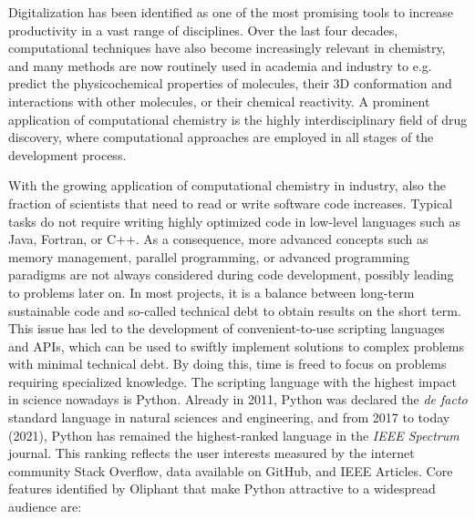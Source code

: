 Digitalization has been identified as one of the most promising tools to increase productivity in a vast range of disciplines.\cite{Tuomi2018}
Over the last four decades, computational techniques have also become increasingly relevant in chemistry, and many methods are now routinely used in academia and industry to e.g. predict the physicochemical properties of molecules, their 3D conformation and interactions with other molecules, or their chemical reactivity. A prominent application of computational chemistry is the highly interdisciplinary field of drug discovery, where computational approaches are employed in all stages of the development process.\cite{Chodera2011, Hansen2014, Abel2017, Cournia2017, Cournia2020, Meier2021}

With the growing application of computational chemistry in industry, also the fraction of scientists that need to read or write software code increases. Typical tasks do not require writing highly optimized code in low-level languages such as Java\cite{Gosling2000}, Fortran\cite{Backus1957}, or C++\cite{Stroustrup1995}. As a consequence, more advanced concepts such as memory management, parallel programming, or advanced programming paradigms are not always considered during code development, possibly leading to problems later on. In most projects, it is a balance between long-term sustainable code and so-called technical debt\cite{Alfayez2018} to obtain results on the short term. This issue has led to the development of convenient-to-use scripting languages and APIs, which can be used to swiftly implement solutions to complex problems with minimal technical debt. By doing this, time is freed to focus on problems requiring specialized knowledge.\cite{Ayer2014} The scripting language with the highest impact in science nowadays is Python. Already in 2011, Python was declared the \textit{de facto} standard language in natural sciences and engineering, and from 2017 to today (2021), Python has remained the highest-ranked language in the \textit{IEEE Spectrum} journal. This ranking reflects the user interests measured by the internet community Stack Overflow, data available on GitHub, and IEEE Articles. \cite{Millman2011, Vanderwalt2011, Cass2017, Cass2018, Cass2019, Cass2020, Cass2021} 
%
Core features identified by Oliphant\cite{Oliphant2007} that make Python attractive to a widespread audience are: 
